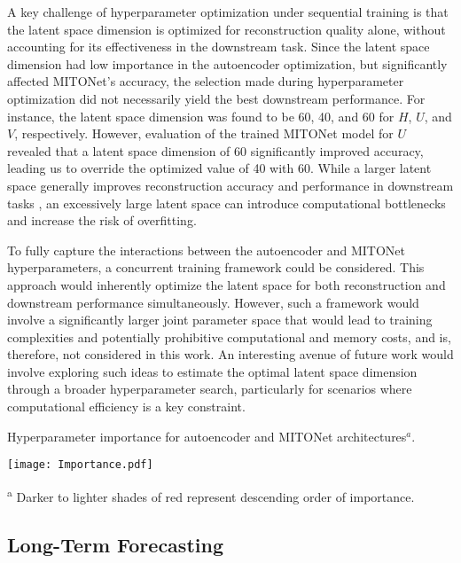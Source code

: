 \documentclass[draft]{agujournal2019}
\begin{document}
A key challenge of hyperparameter optimization under sequential training is that the latent space dimension is optimized for reconstruction quality alone, without accounting for its effectiveness in the downstream task. Since the latent space dimension had low importance in the autoencoder optimization, but significantly affected MITONet’s accuracy, the selection made during hyperparameter optimization did not necessarily yield the best downstream performance. For instance, the latent space dimension was found to be 60, 40, and 60 for $H$, $U$, and $V$, respectively. However, evaluation of the trained MITONet model for $U$ revealed that a latent space dimension of 60 significantly improved accuracy, leading us to override the optimized value of 40 with 60. While a larger latent space generally improves reconstruction accuracy and performance in downstream tasks \cite{kontolati2023learning, dutta2021data}, an excessively large latent space can introduce computational bottlenecks and increase the risk of overfitting. 

To fully capture the interactions between the autoencoder and MITONet hyperparameters, a concurrent training framework could be considered. This approach would inherently optimize the latent space for both reconstruction and downstream performance simultaneously. However, such a framework would involve a significantly larger joint parameter space that would lead to training complexities and potentially prohibitive computational and memory costs, and is, therefore, not considered in this work. An interesting avenue of future work would involve exploring such ideas to estimate the optimal latent space dimension through a broader hyperparameter search, particularly for scenarios where computational efficiency is a key constraint.

\begin{table}[h]
 \centering
  \caption{Hyperparameter importance for autoencoder and MITONet architectures$^{a}$.}
  \label{tbl:importance}
  \texttt{[image: Importance.pdf]}
  \raggedright
  \textsuperscript{a} Darker to lighter shades of red represent descending order of importance.
\end{table}

\subsection{Long-Term Forecasting}
\end{document}
